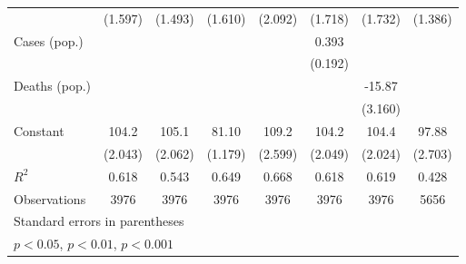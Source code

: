 \documentclass{article}
\begin{document}
{\begin{longtable}{l*{7}{c}}
                &  (1.597)         &  (1.493)         &  (1.610)         &  (2.092)         &  (1.718)         &  (1.732)         &  (1.386)         \\
Cases (pop.)    &                  &                  &                  &                  &    0.393         &                  &                  \\
                &                  &                  &                  &                  &  (0.192)         &                  &                  \\
Deaths (pop.)   &                  &                  &                  &                  &                  &   -15.87\sym{***}&                  \\
                &                  &                  &                  &                  &                  &  (3.160)         &                  \\
Constant        &    104.2\sym{***}&    105.1\sym{***}&    81.10\sym{***}&    109.2\sym{***}&    104.2\sym{***}&    104.4\sym{***}&    97.88\sym{***}\\
                &  (2.043)         &  (2.062)         &  (1.179)         &  (2.599)         &  (2.049)         &  (2.024)         &  (2.703)         \\
\hline
\(R^{2}\)       &    0.618         &    0.543         &    0.649         &    0.668         &    0.618         &    0.619         &    0.428         \\
Observations    &     3976         &     3976         &     3976         &     3976         &     3976         &     3976         &     5656         \\
\hline\hline
\multicolumn{8}{l}{\footnotesize Standard errors in parentheses}\\
\multicolumn{8}{l}{\footnotesize \sym{*} \(p<0.05\), \sym{**} \(p<0.01\), \sym{***} \(p<0.001\)}\\
\end{longtable}
}
\end{document}
